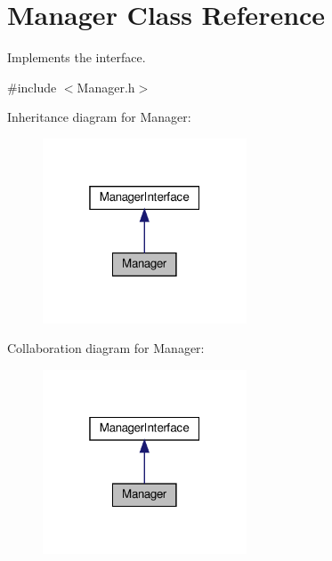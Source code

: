 \hypertarget{classManager}{}\section{Manager Class Reference}
\label{classManager}


Implements the interface.  




{\ttfamily \#include $<$Manager.\+h$>$}



Inheritance diagram for Manager\+:\nopagebreak
\begin{figure}[H]
\begin{center}
\leavevmode
\includegraphics[width=172pt]{classManager__inherit__graph}
\end{center}
\end{figure}


Collaboration diagram for Manager\+:\nopagebreak
\begin{figure}[H]
\begin{center}
\leavevmode
\includegraphics[width=172pt]{classManager__coll__graph}
\end{center}
\end{figure}
